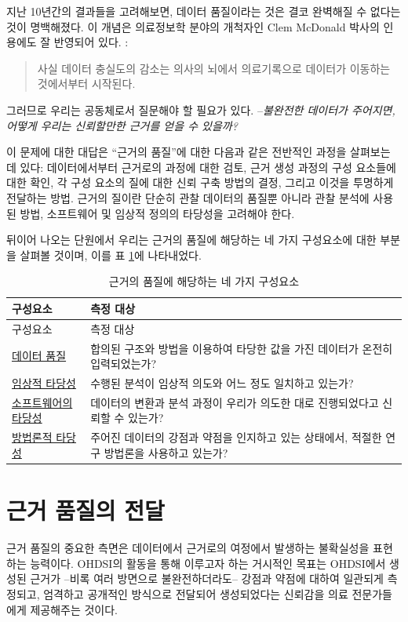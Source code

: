 \documentclass[10.5pt]{book}
\theoremstyle{definition}
\theoremstyle{definition}
\theoremstyle{definition}
\theoremstyle{remark}
\begin{document}
지난 10년간의 결과들을 고려해보면, 데이터 품질이라는 것은 결코 완벽해질
수 없다는 것이 명백해졌다. 이 개념은 의료정보학 분야의 개척자인 Clem
McDonald 박사의 인용에도 잘 반영되어 있다. :

\begin{quote}
사실 데이터 충실도의 감소는 의사의 뇌에서 의료기록으로 데이터가 이동하는
것에서부터 시작된다. 
\end{quote}

그러므로 우리는 공동체로서 질문해야 할 필요가 있다. --\emph{불완전한
데이터가 주어지면, 어떻게 우리는 신뢰할만한 근거를 얻을 수 있을까?}

이 문제에 대한 대답은 ``근거의 품질''에 대한 다음과 같은 전반적인 과정을
살펴보는 데 있다: 데이터에서부터 근거로의 과정에 대한 검토, 근거 생성
과정의 구성 요소들에 대한 확인, 각 구성 요소의 질에 대한 신뢰 구축
방법의 결정, 그리고 이것을 투명하게 전달하는 방법. 근거의 질이란 단순히
관찰 데이터의 품질뿐 아니라 관찰 분석에 사용된 방법, 소프트웨어 및
임상적 정의의 타당성을 고려해야 한다. 

뒤이어 나오는 단원에서 우리는 근거의 품질에 해당하는 네 가지 구성요소에
대한 부분을 살펴볼 것이며, 이를 표 \ref{tab:evidenceQuality}에
나타내었다.

\begin{longtable}[]{@{}ll@{}}
\caption{\label{tab:evidenceQuality} 근거의 품질에 해당하는 네 가지
구성요소}\tabularnewline
\toprule
구성요소 & 측정 대상\tabularnewline
\midrule
\endfirsthead
\toprule
구성요소 & 측정 대상\tabularnewline
\midrule
\endhead
\href{DataQuality.html}{데이터 품질} & 합의된 구조와 방법을 이용하여
타당한 값을 가진 데이터가 온전히 입력되었는가?\tabularnewline
\href{ClinicalValidity.html}{임상적 타당성} & 수행된 분석이 임상적
의도와 어느 정도 일치하고 있는가?\tabularnewline
\href{SoftwareValidity.html}{소프트웨어의 타당성} & 데이터의 변환과 분석
과정이 우리가 의도한 대로 진행되었다고 신뢰할 수 있는가?\tabularnewline
\href{MethodValidity.html}{방법론적 타당성} & 주어진 데이터의 강점과
약점을 인지하고 있는 상태에서, 적절한 연구 방법론을 사용하고
있는가?\tabularnewline
\bottomrule
\end{longtable}

\section{근거 품질의 전달}\label{--}

근거 품질의 중요한 측면은 데이터에서 근거로의 여정에서 발생하는
불확실성을 표현하는 능력이다. OHDSI의 활동을 통해 이루고자 하는 거시적인
목표는 OHDSI에서 생성된 근거가 --비록 여러 방면으로 불완전하더라도--
강점과 약점에 대하여 일관되게 측정되고, 엄격하고 공개적인 방식으로
전달되어 생성되었다는 신뢰감을 의료 전문가들에게 제공해주는 것이다.
\end{document}
